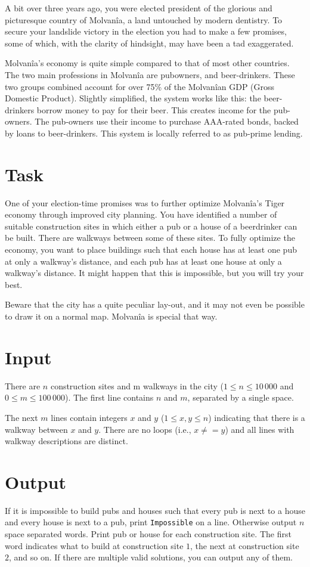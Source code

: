 A bit over three years ago, you were elected president of the
glorious and picturesque country of Molvanîa, a land untouched
by modern dentistry. To secure your landslide victory in the election you had to make a few promises, some of which, with the
clarity of hindsight, may have been a tad exaggerated.

Molvanîa's economy is quite simple compared to that of most
other countries. The two main professions in Molvanîa are pubowners, and beer-drinkers. These two groups combined account
for over 75\% of the Molvanîan GDP (Gross Domestic Product).
Slightly simplified, the system works like this: the beer-drinkers
borrow money to pay for their beer. This creates income for the
pub-owners. The pub-owners use their income to purchase AAA-rated bonds, backed by loans to beer-drinkers. This system is locally referred to as pub-prime lending.

\section*{Task}
One of your election-time promises was to further optimize Molvanîa's Tiger economy through improved city
planning.
You have identified a number of suitable construction sites in which either a pub or a house of a beerdrinker can be built.
There are walkways between some of these sites. To fully optimize the economy, you want to place buildings such that each house has at least one pub at only a walkway's distance, and each pub has at least one house at only a walkway's distance.
It might happen that this is impossible, but you will try your best.

Beware that the city has a quite peculiar lay-out, and it may not even be possible to draw it on a normal map.
Molvanîa is special that way.

\section*{Input}
There are $n$ construction sites and m walkways in the city ($1 \le n \le 10\,000$ and $0 \le m \le 100\,000$).
The first line contains $n$ and $m$, separated by a single space.

The next $m$ lines contain integers $x$ and $y$ ($1 \le x, y \le n$) indicating that there is a walkway between $x$ and $y$.
There are no loops (i.e., $x \neq= y$) and all lines with walkway descriptions are distinct.

\section*{Output}
If it is impossible to build pubs and houses such that every pub is next to a house and every house is next to a pub, print \texttt{Impossible} on a line.
Otherwise output $n$ space separated words.
Print pub or house for each construction site.
The first word indicates what to build at construction site $1$, the next at construction site $2$, and so on.
If there are multiple valid solutions, you can output any of them.
